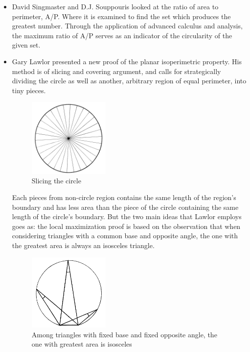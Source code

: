 \documentclass[a4paper]{book}
\numberwithin{theorem}{section}%
\begin{document}
\begin{itemize}
    \item David Singmaster and D.J. Souppouris looked at the ratio of area to perimeter, A/P. Where it is examined to find the set which produces the greatest number. Through the application of advanced calculus and analysis, the maximum ratio of A/P serves as an indicator of the circularity of the given set.~\citep{singmaster1978problem}
    \newpage
    \item Gary Lawlor presented a new proof of the planar isoperimetric property. His method is of slicing and covering argument, and calls for strategically dividing the circle as well as another, arbitrary region of equal perimeter, into tiny pieces. 
    \begin{figure}[hbt!]
        \begin{center}   
            \includegraphics[width=40mm]{Lawlor1}
            \caption{Slicing the circle}
        \end{center}
    \end{figure}\leavevmode
    \newline
    Each pieces from non-circle region contains the same length of the region’s boundary and has less area than the piece of the circle containing the same length of the circle’s boundary. But the two main ideas that Lawlor employs goes as: the local maximization proof is based on the observation that when considering triangles with a common base and opposite angle, the one with the greatest area is always an isosceles triangle. 
    \begin{figure}[hbt!]
        \begin{center}   
            \includegraphics[width=40mm]{Lawlor3}
            \caption{Among triangles with fixed base and fixed opposite angle, the one with greatest area is isosceles}

\end{center}
\end{figure}
\end{itemize}
\end{document}
